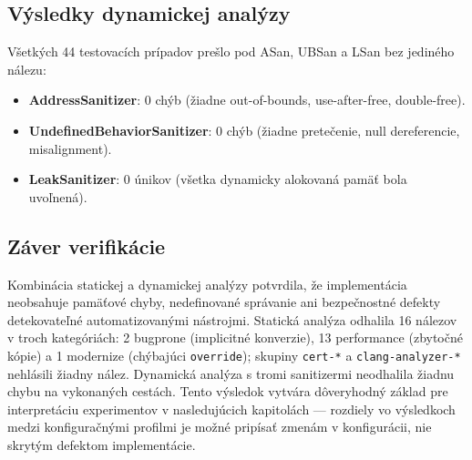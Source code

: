 \documentclass[journal,a4paper,onecolumn]{IEEEtran}
\begin{document}
\subsection{Výsledky dynamickej analýzy}

Všetkých 44 testovacích prípadov prešlo pod ASan, UBSan a LSan bez jediného nálezu:

\begin{itemize}
\item \textbf{AddressSanitizer}: 0 chýb (žiadne out-of-bounds, use-after-free, double-free).
\item \textbf{UndefinedBehaviorSanitizer}: 0 chýb (žiadne pretečenie, null dereferencie, misalignment).
\item \textbf{LeakSanitizer}: 0 únikov (všetka dynamicky alokovaná pamäť bola uvoľnená).
\end{itemize}

\subsection{Záver verifikácie}

Kombinácia statickej a dynamickej analýzy potvrdila, že implementácia neobsahuje pamäťové chyby, nedefinované správanie ani bezpečnostné defekty detekovateľné automatizovanými nástrojmi. Statická analýza odhalila 16 nálezov v troch kategóriách: 2 bugprone (implicitné konverzie), 13 performance (zbytočné kópie) a 1 modernize (chýbajúci \texttt{override}); skupiny \texttt{cert-*} a \texttt{clang-analyzer-*} nehlásili žiadny nález. Dynamická analýza s tromi sanitizermi neodhalila žiadnu chybu na vykonaných cestách. Tento výsledok vytvára dôveryhodný základ pre interpretáciu experimentov v nasledujúcich kapitolách --- rozdiely vo výsledkoch medzi konfiguračnými profilmi je možné pripísať zmenám v konfigurácii, nie skrytým defektom implementácie.
\end{document}
